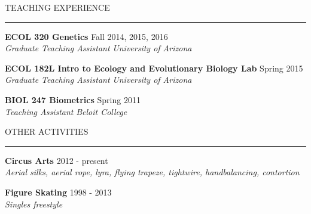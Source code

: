 \documentclass{resume} %
\renewenvironment{rSection}[1]{
\sectionskip
\textcolor{RoyalPurple}{\MakeUppercase{#1}}
\sectionlineskip
\hrule
\begin{list}{}{
\setlength{\leftmargin}{1.5em}
}
\item[]
}{
\end{list}
}
\begin{document}

\begin{rSection}{Teaching Experience}

{\bf ECOL 320 Genetics} \hfill Fall 2014, 2015, 2016 \\ 
{\em Graduate Teaching Assistant} \hfill {\em University of Arizona}

{\bf ECOL 182L Intro to Ecology and Evolutionary Biology Lab} \hfill Spring 2015 \\ 
{\em Graduate Teaching Assistant} \hfill {\em University of Arizona}

{\bf BIOL 247 Biometrics} \hfill Spring 2011 \\ 
{\em Teaching Assistant} \hfill {\em Beloit College}


\end{rSection}


%
%
%


\begin{rSection}{Other Activities}

{\bf Circus Arts} \hfill 2012 - present \\ 
{\em Aerial silks, aerial rope, lyra, flying trapeze, tightwire, handbalancing, contortion} 

{\bf Figure Skating} \hfill 1998 - 2013 \\ 
{\em Singles freestyle} 

\end{rSection}
\end{document}
